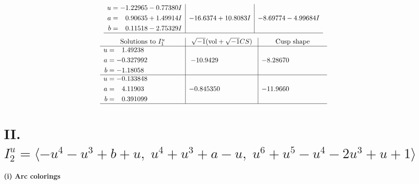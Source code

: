 \documentclass[1p]{elsarticle_modified}
\theoremstyle{definition}
\newcommand{\I}{\sqrt{-1}}
\begin{document}
$$\begin{array}{c|c|c}
\begin{aligned}
u &= -1.22965 - 0.77380 I \\
a &= \phantom{-}0.90635 + 1.49914 I \\
b &= \phantom{-}0.11518 - 2.75329 I\end{aligned}
 & -16.6374 + 10.8083 I & -8.69774 - 4.99684 I\\
 \hline 
 \end{array}$$\newpage$$\begin{array}{c|c|c}  
\text{Solutions to }I^u_{1}& \I (\text{vol} + \sqrt{-1}CS) & \text{Cusp shape}\\
 \hline 
\begin{aligned}
u &= \phantom{-}1.49238\phantom{ +0.000000I} \\
a &= -0.327992\phantom{ +0.000000I} \\
b &= -1.18058\phantom{ +0.000000I}\end{aligned}
 & -10.9429\phantom{ +0.000000I} & -8.28670\phantom{ +0.000000I} \\ \hline\begin{aligned}
u &= -0.133848\phantom{ +0.000000I} \\
a &= \phantom{-}4.11903\phantom{ +0.000000I} \\
b &= \phantom{-}0.391099\phantom{ +0.000000I}\end{aligned}
 & -0.845350\phantom{ +0.000000I} & -11.9660\phantom{ +0.000000I}\\
 \hline 
 \end{array}$$\newpage\newpage\renewcommand{\arraystretch}{1}
\centering \section*{II. $I^u_{2}= \langle - u^4- u^3+b+u,\;u^4+u^3+a- u,\;u^6+u^5- u^4-2 u^3+u+1 \rangle$}
\flushleft \textbf{(i) Arc colorings}\\
\end{document}
